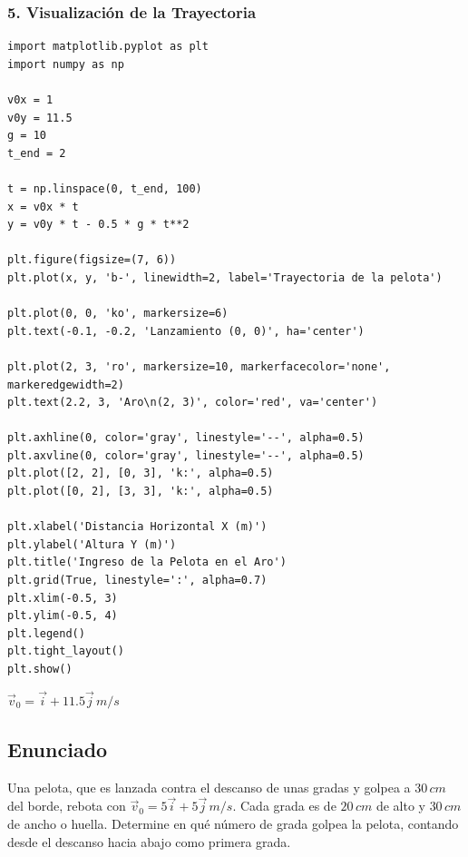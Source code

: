 \documentclass[12pt, a4paper]{article}
\begin{document}
\subsubsection*{5. Visualización de la Trayectoria}
\begin{verbatim}
import matplotlib.pyplot as plt
import numpy as np

v0x = 1
v0y = 11.5
g = 10
t_end = 2

t = np.linspace(0, t_end, 100)
x = v0x * t
y = v0y * t - 0.5 * g * t**2

plt.figure(figsize=(7, 6))
plt.plot(x, y, 'b-', linewidth=2, label='Trayectoria de la pelota')

plt.plot(0, 0, 'ko', markersize=6)
plt.text(-0.1, -0.2, 'Lanzamiento (0, 0)', ha='center')

plt.plot(2, 3, 'ro', markersize=10, markerfacecolor='none', markeredgewidth=2)
plt.text(2.2, 3, 'Aro\n(2, 3)', color='red', va='center')

plt.axhline(0, color='gray', linestyle='--', alpha=0.5)
plt.axvline(0, color='gray', linestyle='--', alpha=0.5)
plt.plot([2, 2], [0, 3], 'k:', alpha=0.5)
plt.plot([0, 2], [3, 3], 'k:', alpha=0.5)

plt.xlabel('Distancia Horizontal X (m)')
plt.ylabel('Altura Y (m)')
plt.title('Ingreso de la Pelota en el Aro')
plt.grid(True, linestyle=':', alpha=0.7)
plt.xlim(-0.5, 3)
plt.ylim(-0.5, 4)
plt.legend()
plt.tight_layout()
plt.show()
\end{verbatim}

\begin{tcolorbox}[colback=green!5!white, colframe=green!50!black, title=Respuesta Final]
\centering \Large $\vec{v}_0 = \vec{i} + 11.5\vec{j} \, \si{m/s}$
\end{tcolorbox}

\newpage

\subsection*{Enunciado}
Una pelota, que es lanzada contra el descanso de unas gradas y golpea a $30 \, \si{cm}$ del borde, rebota con $\vec{v}_0 = 5\vec{i} + 5\vec{j} \, \si{m/s}$. Cada grada es de $20 \, \si{cm}$ de alto y $30 \, \si{cm}$ de ancho o huella. Determine en qué número de grada golpea la pelota, contando desde el descanso hacia abajo como primera grada. 
\end{document}
